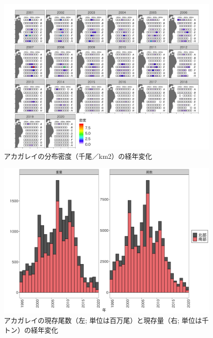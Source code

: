 \documentclass[11pt]{article} %
\begin{document}
\begin{linenumbers}
\begin{figure}[h]
  \centering
  \includegraphics[width = 14cm]{アカガレイdens.png}
  \caption{アカガレイの分布密度（千尾／km2）の経年変化}
\end{figure}

\begin{figure}[h]
  \centering
  \includegraphics[width = 14cm]{アカガレイtrend.png}
  \caption{アカガレイの現存尾数（左; 単位は百万尾）と現存量（右; 単位は千トン）の経年変化}
\end{figure}


\end{linenumbers}
\end{document}
